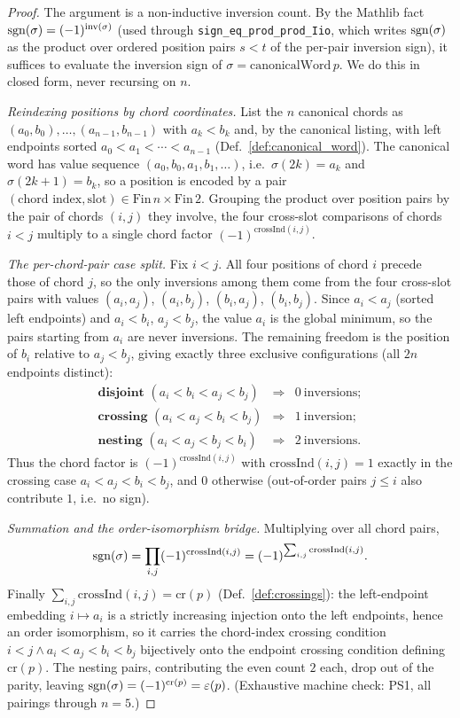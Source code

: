 \begin{proof}\leanok
{}
The argument is a non-inductive inversion count. By the Mathlib fact
$\operatorname{sgn}(\sigma)=(-1)^{\operatorname{inv}(\sigma)}$ (used through \texttt{sign\_eq\_prod\_prod\_Iio},
which writes $\operatorname{sgn}(\sigma)$ as the product over ordered position pairs $s<t$ of the
per-pair inversion sign), it suffices to evaluate the inversion sign of
$\sigma=\text{canonicalWord}\,p$. We do this in closed form, never recursing on $n$.

\medskip\noindent\emph{Reindexing positions by chord coordinates.}
List the $n$ canonical chords as $(a_0,b_0),\dots,(a_{n-1},b_{n-1})$ with $a_k<b_k$ and,
by the canonical listing, with left endpoints sorted $a_0<a_1<\cdots<a_{n-1}$
(Def.~\ref{def:canonical_word}). The canonical word has value sequence
$(a_0,b_0,a_1,b_1,\dots)$, i.e.\ $\sigma(2k)=a_k$ and $\sigma(2k+1)=b_k$, so a position
is encoded by a pair $(\text{chord index},\text{slot})\in\mathrm{Fin}\,n\times\mathrm{Fin}\,2$.
Grouping the product over position pairs by the pair of chords $(i,j)$ they involve, the
four cross-slot comparisons of chords $i<j$ multiply to a single chord factor
$(-1)^{\mathrm{crossInd}(i,j)}$.

\medskip\noindent\emph{The per-chord-pair case split.}
Fix $i<j$. All four positions of chord $i$ precede those of chord $j$, so the only
inversions among them come from the four cross-slot pairs with values $(a_i,a_j)$,
$(a_i,b_j)$, $(b_i,a_j)$, $(b_i,b_j)$. Since $a_i<a_j$ (sorted left endpoints) and
$a_i<b_i$, $a_j<b_j$, the value $a_i$ is the global minimum, so the pairs starting from
$a_i$ are never inversions. The remaining freedom is the position of $b_i$ relative to
$a_j<b_j$, giving exactly three exclusive configurations (all $2n$ endpoints distinct):
\[
  \begin{array}{lll}
    \textbf{disjoint } (a_i<b_i<a_j<b_j) & \Rightarrow & 0\ \text{inversions};\\[2pt]
    \textbf{crossing } (a_i<a_j<b_i<b_j) & \Rightarrow & 1\ \text{inversion};\\[2pt]
    \textbf{nesting } (a_i<a_j<b_j<b_i) & \Rightarrow & 2\ \text{inversions}.
  \end{array}
\]
Thus the chord factor is $(-1)^{\mathrm{crossInd}(i,j)}$ with
$\mathrm{crossInd}(i,j)=1$ exactly in the crossing case $a_i<a_j<b_i<b_j$, and $0$
otherwise (out-of-order pairs $j\le i$ also contribute $1$, i.e.\ no sign).

\medskip\noindent\emph{Summation and the order-isomorphism bridge.}
Multiplying over all chord pairs,
\[
  \operatorname{sgn}(\sigma)=\prod_{i,j}(-1)^{\mathrm{crossInd}(i,j)}
  =(-1)^{\sum_{i,j}\mathrm{crossInd}(i,j)}.
\]
Finally $\sum_{i,j}\mathrm{crossInd}(i,j)=\mathrm{cr}(p)$ (Def.~\ref{def:crossings}):
the left-endpoint embedding $i\mapsto a_i$ is a strictly increasing injection onto the
left endpoints, hence an order isomorphism, so it carries the chord-index crossing
condition $i<j\wedge a_i<a_j<b_i<b_j$ bijectively onto the endpoint crossing condition
defining $\mathrm{cr}(p)$. The nesting pairs, contributing the even count $2$ each, drop
out of the parity, leaving $\operatorname{sgn}(\sigma)=(-1)^{\mathrm{cr}(p)}=\varepsilon(p)$.
(Exhaustive machine check: PS1, all pairings through $n=5$.)


\end{proof}
